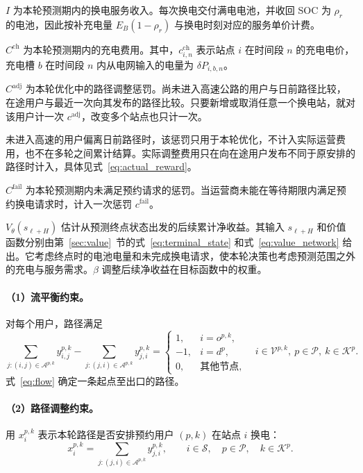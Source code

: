 $I$ 为本轮预测期内的换电服务收入。每次换电交付满电电池，并收回 SOC 为 $\rho_r$ 的电池，因此按补充电量 $E_B(1-\rho_r)$ 与换电时刻对应的服务单价计费。

$C^{\mathrm{ch}}$ 为本轮预测期内的充电费用。其中，$c_{i,n}^{\mathrm{ch}}$ 表示站点 $i$ 在时间段 $n$ 的充电电价，充电槽 $b$ 在时间段 $n$ 内从电网输入的电量为 $\delta P_{i,b,n}$。

$C^{\mathrm{adj}}$ 为本轮优化中的路径调整惩罚。尚未进入高速公路的用户与日前路径比较，在途用户与最近一次向其发布的路径比较。只要新增或取消任意一个换电站，就对该用户计一次 $c^{\mathrm{adj}}$，改变多个站点也只计一次。

未进入高速的用户偏离日前路径时，该惩罚只用于本轮优化，不计入实际运营费用，也不在多轮之间累计结算。实际调整费用只在向在途用户发布不同于原安排的路径时计入，具体见式~\eqref{eq:actual_reward}。

$C^{\mathrm{fail}}$ 为本轮预测期内未满足预约请求的惩罚。当运营商未能在等待期限内满足预约换电请求时，计入一次惩罚 $c^{\mathrm{fail}}$。

$V_\theta(s_{\ell+H})$ 估计从预测终点状态出发的后续累计净收益。其输入 $s_{\ell+H}$ 和价值函数分别由第~\ref{sec:value}~节的式~\eqref{eq:terminal_state} 和式~\eqref{eq:value_network} 给出。它考虑终点时的电池电量和未完成换电请求，使本轮决策也考虑预测范围之外的充电与服务需求。$\beta$ 调整后续净收益在目标函数中的权重。


\paragraph{（1）流平衡约束。}
对每个用户，路径满足
\begin{equation}
\sum_{j:(i,j)\in\mathcal A^{p,k}}y_{i,j}^{p,k}
-\sum_{j:(j,i)\in\mathcal A^{p,k}}y_{j,i}^{p,k}
=\begin{cases}
1,&i=o^{p,k},\\-1,&i=d^p,\\0,&\text{其他节点},
\end{cases}
\quad i\in\mathcal V^{p,k},\ p\in\mathcal P,\ k\in\mathcal K^p.
\label{eq:flow}
\end{equation}
式~\eqref{eq:flow} 确定一条起点至出口的路径。

\paragraph{（2）路径调整约束。}
用 $x_i^{p,k}$ 表示本轮路径是否安排预约用户 $(p,k)$ 在站点 $i$ 换电：
\begin{equation}
x_i^{p,k}=\sum_{j:(j,i)\in\mathcal A^{p,k}}y_{j,i}^{p,k},
\qquad i\in\mathcal S,\quad p\in\mathcal P,\quad k\in\mathcal K^p.
\label{eq:station_visit}
\end{equation}


